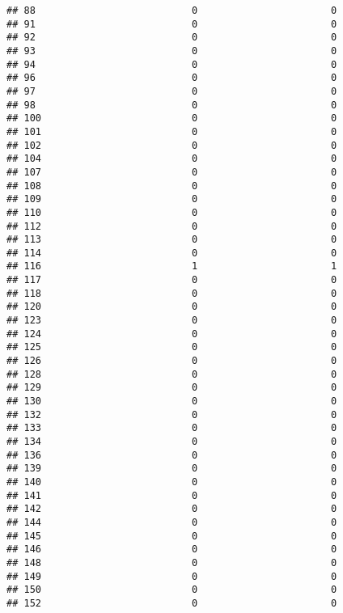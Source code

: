\documentclass[
]{article}
\begin{document}
\begin{verbatim}
## 88                           0                       0
## 91                           0                       0
## 92                           0                       0
## 93                           0                       0
## 94                           0                       0
## 96                           0                       0
## 97                           0                       0
## 98                           0                       0
## 100                          0                       0
## 101                          0                       0
## 102                          0                       0
## 104                          0                       0
## 107                          0                       0
## 108                          0                       0
## 109                          0                       0
## 110                          0                       0
## 112                          0                       0
## 113                          0                       0
## 114                          0                       0
## 116                          1                       1
## 117                          0                       0
## 118                          0                       0
## 120                          0                       0
## 123                          0                       0
## 124                          0                       0
## 125                          0                       0
## 126                          0                       0
## 128                          0                       0
## 129                          0                       0
## 130                          0                       0
## 132                          0                       0
## 133                          0                       0
## 134                          0                       0
## 136                          0                       0
## 139                          0                       0
## 140                          0                       0
## 141                          0                       0
## 142                          0                       0
## 144                          0                       0
## 145                          0                       0
## 146                          0                       0
## 148                          0                       0
## 149                          0                       0
## 150                          0                       0
## 152                          0                       0

\end{verbatim}
\end{document}
